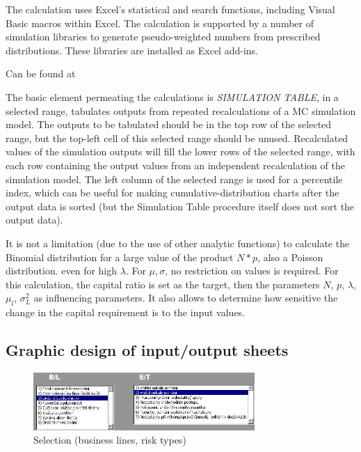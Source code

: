 \documentclass{article}
\begin{document}
The calculation uses Excel's statistical and search functions, including Visual Basic macros within Excel. The calculation is supported by a number of simulation libraries to generate pseudo-weighted numbers from prescribed distributions. These libraries are installed as Excel add-ins.

Can be found at \cite{addins}

The basic element permeating the calculations is \emph{SIMULATION TABLE}, in a selected range, tabulates outputs from repeated recalculations of a MC simulation model. The outputs to be tabulated should be in the top row of the selected range, but the top-left cell of this selected range should be unused. Recalculated values of the simulation outputs will fill the lower rows of the selected range, with each row containing the output values from an independent recalculation of the simulation model. The left column of the selected range is used for a percentile index, which can be useful for making cumulative-distribution charts after the output data is sorted (but the Simulation Table procedure itself does not sort the output data).

It is not a limitation (due to the use of other analytic functions) to calculate the Binomial distribution for a large value of the product $N * p$, also a Poisson distribution. even for high $\lambda$.  For $\mu, \sigma$,  no restriction on values is required. For this calculation, the capital ratio is set as the target, then the parameters $N$, $p$, $\lambda$, $\mu_l$, $\sigma_L^2$ as influencing parameters. It also allows to determine how sensitive the change in the capital requirement is to the input values.


\subsection{Graphic design of input/output sheets}

\begin{figure}[H]
  \caption{Selection (business lines, risk types)}
  \centering
    \includegraphics[width=0.75\textwidth]{matice}
\end{figure}
\end{document}

